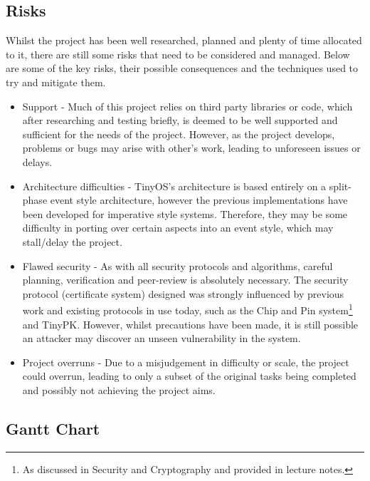 \documentclass{mprop}
\begin{document}
\subsection{Risks} %
\label{sub:risks}
Whilst the project has been well researched, planned and plenty of time allocated to it, there are still some risks that need to be considered and managed. Below are some of the key risks, their possible consequences and the techniques used to try and mitigate them.
\begin{itemize}
  \item Support - Much of this project relies on third party libraries or code, which after researching and testing briefly, is deemed to be well supported and sufficient for the needs of the project. However, as the project develops, problems or bugs may arise with other's work, leading to unforeseen issues or delays.
  \item Architecture difficulties - TinyOS's architecture is based entirely on a split-phase event style architecture, however the previous implementations have been developed for imperative style systems. Therefore, they may be some difficulty in porting over certain aspects into an event style, which may stall/delay the project.
  \item Flawed security - As with all security protocols and algorithms, careful planning, verification and peer-review is absolutely necessary. The security protocol (certificate system) designed was strongly influenced by previous work and existing protocols in use today, such as the Chip and Pin system\footnote{As discussed in Security and Cryptography and provided in lecture notes.} and TinyPK. However, whilst precautions have been made, it is still possible an attacker may discover an unseen vulnerability in the system. 
  \item Project overruns - Due to a misjudgement in difficulty or scale, the project could overrun, leading to only a subset of the original tasks being completed and possibly not achieving the project aims.
\end{itemize}

\subsection{Gantt Chart} %
\label{sub:gantt_chart}


\newpage


\end{document}

